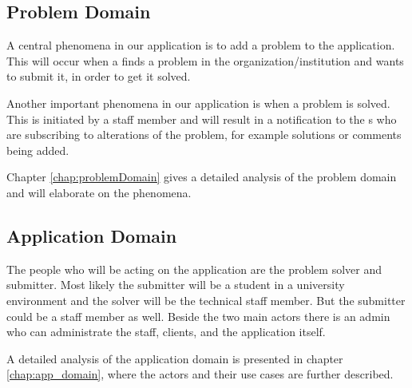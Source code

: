 \subsection{Problem Domain}
A central phenomena in our application is to add a problem to the application.
This will occur when a \aclient[] finds a problem in the organization/institution and wants to submit it, in order to get it solved.

Another important phenomena in our application is when a problem is solved.
This is initiated by a staff member and will result in a notification to the \aclient s who are subscribing to alterations of the problem, for example solutions or comments being added.

Chapter \ref{chap:problemDomain} gives a detailed analysis of the problem domain and will elaborate on the phenomena.
\vspace{-3mm}
\subsection{Application Domain}
The people who will be acting on the application are the problem solver and submitter. Most likely the submitter will be a student in a university environment and the solver will be the technical staff member. But the submitter could be a staff member as well. Beside the two main actors there is an admin who can administrate the staff, clients, and the application itself.

A detailed analysis of the application domain is presented in chapter \ref{chap:app_domain}, where the actors and their use cases are further described.